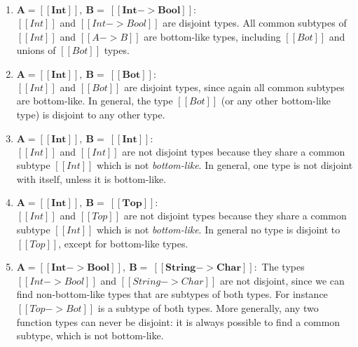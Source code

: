\begin{enumerate}
  \item $\boldsymbol{A = [[Int]], \ B = \ [[Int -> Bool]]:}$ \\
        $[[Int]]$ and $[[Int -> Bool]]$ are disjoint types. All common subtypes of $[[Int]]$ and $[[A -> B]]$ are bottom-like types,
        including $[[Bot]]$ and unions of $[[Bot]]$ types.
  \item $\boldsymbol{A = [[Int]], \ B = \ [[Bot]]:}$ \\
    $[[Int]]$ and $[[Bot]]$ are disjoint types, since again all common subtypes are bottom-like. In general, the type $[[Bot]]$ (or any other bottom-like type)
    is disjoint to any other type.
  \item $\boldsymbol{A = [[Int]], \ B = \ [[Int]]:}$ \\
        $[[Int]]$ and $[[Int]]$ are not disjoint types because they share a common subtype $[[Int]]$ which
        is not \emph{bottom-like}. In general, one type is not disjoint with
        itself, unless it is bottom-like.
  \item $\boldsymbol{A = [[Int]], \ B = \ [[Top]]:}$ \\
        $[[Int]]$ and $[[Top]]$ are not disjoint types because they share a common
    subtype $[[Int]]$ which is not \emph{bottom-like}. In general no type
    is disjoint to $[[Top]]$, except for bottom-like types.
  \item $\boldsymbol{A = [[Int -> Bool]], \ B = \ [[String -> Char]]:}$
    The types $[[Int -> Bool]]$ and $[[String -> Char]]$ are not disjoint,
    since we can find non-bottom-like types that are subtypes
    of both types. For instance $[[Top -> Bot]]$ is a subtype of both types.
    More generally, any two function types can never be disjoint: it is always
    possible to find a common subtype, which is not bottom-like.
    \\
\end{enumerate}

\begin{comment}
\begin{figure}[t]
  \begin{small}
    \centering
    \drules[ad]{$[[A * B]]$}{Algorithmic Disjointness}{btmr, btml, intl, intr, orl, orr}
  \end{small}
  \caption{Algorithmic Disjointness for \cal.}
  \label{fig:union:ad}
\end{figure}
\end{comment}

